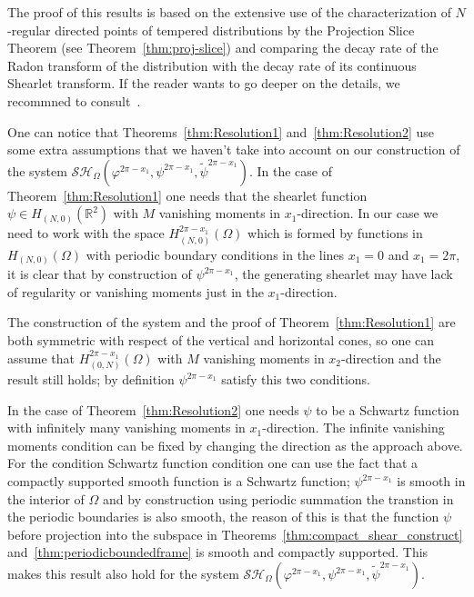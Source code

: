 \documentclass[a4paper]{article}
\begin{document}
\bigskip

The proof of this results is based on the extensive use of the characterization of $N$-regular directed points of tempered distributions by the Projection Slice Theorem (see Theorem~\ref{thm:proj-slice}) and comparing the decay rate of the Radon transform of the distribution with the decay rate of its continuous Shearlet transform. If the reader wants to go deeper on the details, we recommned to consult~\cite{WaveFrontSetGrohs}. 

\bigskip

One can notice that Theorems~\ref{thm:Resolution1} and~\ref{thm:Resolution2} use some extra assumptions that we haven't take into account on our construction of the system $\mathcal{SH}_{\Omega}(\varphi^{2\pi-x_1},\psi^{2\pi-x_1},\tilde{\psi}^{2\pi-x_1})$. In the case of Theorem~\ref{thm:Resolution1} one needs that the shearlet function $\psi\in H_{(N,0)}(\mathbb{R}^2)$ with $M$ vanishing moments in  $x_1$-direction. In our case we need to work with the space $H^{2\pi-x_1}_{(N,0)}(\Omega)$ which is formed by functions in $H_{(N,0)}(\Omega)$ with periodic boundary conditions in the lines $x_1=0$ and $x_1=2\pi$, it is clear that by construction of $\psi^{2\pi-x_1}$, the generating shearlet may have lack of regularity or vanishing moments just in the $x_1$-direction.

\bigskip

The construction of the system and the proof of Theorem~\ref{thm:Resolution1} are both symmetric with respect of the vertical and horizontal cones, so one can assume that $H^{2\pi-x_1}_{(0,N)}(\Omega)$ with $M$ vanishing moments in $x_2$-direction and the result still holds; by definition $\psi^{2\pi-x_1}$ satisfy this two conditions.

\bigskip

In the case of Theorem~\ref{thm:Resolution2} one needs $\psi$ to be a Schwartz function with infinitely many vanishing moments in $x_1$-direction. The infinite vanishing moments condition can be fixed by changing the direction as the approach above. For the condition Schwartz function condition one can use the fact that a compactly supported smooth function is a Schwartz function; $\psi^{2\pi-x_1}$ is smooth in the interior of $\Omega$ and by construction using periodic summation the transtion in the periodic boundaries is also smooth, the reason of this is that the function $\psi$ before projection into the subspace in Theorems~\ref{thm:compact_shear_construct} and~\ref{thm:periodicboundedframe} is smooth and compactly supported. This makes this result also hold for the system $\mathcal{SH}_{\Omega}(\varphi^{2\pi-x_1},\psi^{2\pi-x_1},\tilde{\psi}^{2\pi-x_1})$.
\end{document}
